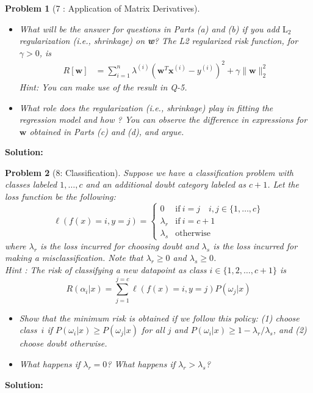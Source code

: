 \documentclass[11pt]{article}
\theoremstyle{quest}
\newtheorem*{question}{Problem}
\begin{document}
\begin{question}[7 : Application of Matrix Derivatives]
\begin{itemize}
\item[(c)] What will be the answer for questions in Parts (a) and (b) if you add $\text{L}_2$ regularization (i.e., shrinkage) on \textbf{w}? The L2 regularized risk function, for $\gamma>0$, is
\begin{align*}
R[\textbf{w}] &= \sum_{i=1}^{n} \lambda^{(i)}(\textbf{w}^T\textbf{x}^{(i)}-y^{(i)})^2 + \gamma \|\textbf{w}\|^2_2
\end{align*}
Hint: You can make use of the result in Q-5.
\item[(d)] What role does the regularization (i.e., shrinkage) play in fitting the regression model and how ? You can observe the difference in expressions for $\textbf{w}$ obtained in Parts (c) and (d), and argue.
\end{itemize}
\end{question}
\textbf{Solution:}
\newpage


\begin{question}[8: Classification]
Suppose we have a classification problem with classes labeled $1, \dotsc, c$ and an additional doubt category labeled as $c+1$.
Let the loss function be the following:\\
\[
\ell(f(x) = i, y = j) =
  \begin{cases}
   0 &  \mathrm{if}\ i=j \quad i,j\in\{1,\dotsc,c\} \\
   \lambda_r       & \mathrm{if}\ i=c+1 \\
   \lambda_s       & \text{otherwise}
  \end{cases}
\]
where $\lambda_r$ is the loss incurred for choosing doubt and $\lambda_s$ is the loss incurred for making a misclassification. Note that $\lambda_r \ge 0$ and $\lambda_s \ge 0$. \\
Hint : The risk of classifying a new datapoint as class $i\in\{1,2,\dots,c+1\}$ is $$R(\alpha_i|x) = \sum_{j=1}^{j=c} \ell(f(x) = i, y = j) P(\omega_j|x)$$

\begin{itemize}
\item[(a)] Show that the minimum risk is obtained if we follow this policy: (1) choose class~$i$ if $P(\omega_i|x) \geq P(\omega_j|x)$ for all $j$ and $P(\omega_i|x) \geq 1-\lambda_r/\lambda_s$, and (2) choose doubt otherwise.
\item[(b)] What happens if $\lambda_r=0$? What happens if $\lambda_r>\lambda_s$?
\end{itemize}
\end{question}
\textbf{Solution:}
\newpage

\end{document}
